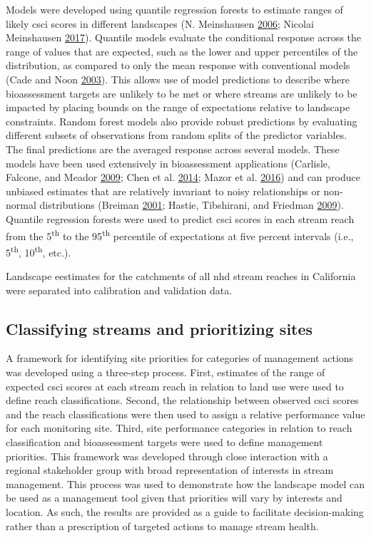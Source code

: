 \documentclass[]{article}
\begin{document}
Models were developed using quantile regression forests to estimate
ranges of likely \ac{csci} scores in different landscapes (N.
Meinshausen \protect\hyperlink{ref-Meinshausen06}{2006}; Nicolai
Meinshausen \protect\hyperlink{ref-Meinshausen17}{2017}). Quantile
models evaluate the conditional response across the range of values that
are expected, such as the lower and upper percentiles of the
distribution, as compared to only the mean response with conventional
models (Cade and Noon \protect\hyperlink{ref-Cade03}{2003}). This allows
use of model predictions to describe where bioassessment targets are
unlikely to be met or where streams are unlikely to be impacted by
placing bounds on the range of expectations relative to landscape
constraints. Random forest models also provide robust predictions by
evaluating different subsets of observations from random splits of the
predictor variables. The final predictions are the averaged response
across several models. These models have been used extensively in
bioassessment applications (Carlisle, Falcone, and Meador
\protect\hyperlink{ref-Carlisle09}{2009}; Chen et al.
\protect\hyperlink{ref-Chen14}{2014}; Mazor et al.
\protect\hyperlink{ref-Mazor16}{2016}) and can produce unbiased
estimates that are relatively invariant to noisy relationships or
non-normal distributions (Breiman
\protect\hyperlink{ref-Breiman01}{2001}; Hastie, Tibshirani, and
Friedman \protect\hyperlink{ref-Hastie09}{2009}). Quantile regression
forests were used to predict \ac{csci} scores in each stream reach from
the 5\textsuperscript{th} to the 95\textsuperscript{th} percentile of
expectations at five percent intervals (i.e., 5\textsuperscript{th},
10\textsuperscript{th}, etc.).

Landscape eestimates for the catchments of all \ac{nhd} stream reaches
in California were separated into calibration and validation data.

\subsection{Classifying streams and prioritizing
sites}\label{classifying-streams-and-prioritizing-sites}

A framework for identifying site priorities for categories of management
actions was developed using a three-step process. First, estimates of
the range of expected \ac{csci} scores at each stream reach in relation
to land use were used to define reach classifications. Second, the
relationship between observed \ac{csci} scores and the reach
classifications were then used to assign a relative performance value
for each monitoring site. Third, site performance categories in relation
to reach classification and bioassessment targets were used to define
management priorities. This framework was developed through close
interaction with a regional stakeholder group with broad representation
of interests in stream management. This process was used to demonstrate
how the landscape model can be used as a management tool given that
priorities will vary by interests and location. As such, the results are
provided as a guide to facilitate decision-making rather than a
prescription of targeted actions to manage stream health.
\end{document}
